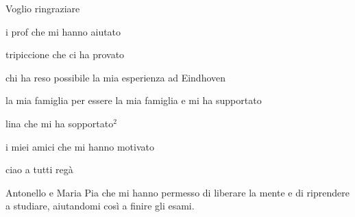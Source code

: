 \documentclass{standalone}
\begin{document}
Voglio ringraziare 

i prof che mi hanno aiutato

tripiccione che ci ha provato

chi ha reso possibile la mia esperienza ad Eindhoven

la mia famiglia per essere la mia famiglia e mi ha supportato

lina che mi ha sopportato$^2$

i miei amici che mi hanno motivato

ciao a tutti regà


Antonello e Maria Pia che mi hanno permesso di liberare la mente e di riprendere a studiare, aiutandomi così a finire gli esami.
\end{document}
